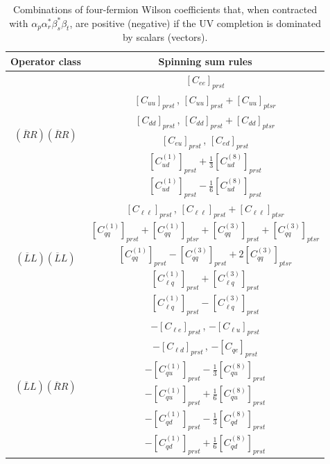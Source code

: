 \begin{table}[htbp]
\renewcommand{\arraystretch}{1.5}
    \centering
    \begin{tabular}{cc}
    \toprule
    \rowcolor{hdrcolor}
    \textbf{Operator class} & \textbf{Spinning sum rules} \\
    \midrule
    \multirow{6}{*}{\boldmath$(\overline{R}R)(\overline{R}R)$} &
    $[C_{ee}]_{prst}$ \\
    & $[C_{uu}]_{prst}$\,, \qquad $[C_{uu}]_{prst} + [C_{uu}]_{ptsr}$ \\
    & $[C_{dd}]_{prst}$\,, \qquad $[C_{dd}]_{prst} + [C_{dd}]_{ptsr}$ \\
    & $[C_{eu}]_{prst}$\,, \qquad $[C_{ed}]_{prst}$ \\
    & $[C_{ud}^{(1)}]_{prst}+\tfrac{1}{3}[C_{ud}^{(8)}]_{prst}$ \\
    & $[C_{ud}^{(1)}]_{prst}-\tfrac{1}{6}[C_{ud}^{(8)}]_{prst}$ \\
    \midrule
    \multirow{5}{*}{\boldmath$(\overline{L}L)(\overline{L}L)$} &
    $[C_{\ell\ell}]_{prst}$\,, \qquad $[C_{\ell\ell}]_{prst} + [C_{\ell\ell}]_{ptsr}$ \\
    & $[C_{qq}^{(1)}]_{prst} + [C_{qq}^{(1)}]_{ptsr} + [C_{qq}^{(3)}]_{prst} + [C_{qq}^{(3)}]_{ptsr}$ \\
    & $[C_{qq}^{(1)}]_{prst} - [C_{qq}^{(3)}]_{prst} + 2[C_{qq}^{(3)}]_{ptsr}$ \\
    & $[C_{\ell q}^{(1)}]_{prst} + [C_{\ell q}^{(3)}]_{prst}$ \\
    & $[C_{\ell q}^{(1)}]_{prst} - [C_{\ell q}^{(3)}]_{prst}$ \\
    \midrule
    \multirow{6}{*}{\boldmath$(\overline{L}L)(\overline{R}R)$} &
    $-[C_{\ell e}]_{prst}$\,, \qquad $-[C_{\ell u}]_{prst}$ \\
    & $-[C_{\ell d}]_{prst}$\,, \qquad $-[C_{qe}]_{prst}$ \\
    & $-[C_{qu}^{(1)}]_{prst} - \tfrac{1}{3}[C_{qu}^{(8)}]_{prst}$ \\
    & $-[C_{qu}^{(1)}]_{prst} + \tfrac{1}{6}[C_{qu}^{(8)}]_{prst}$ \\
    & $-[C_{qd}^{(1)}]_{prst} - \tfrac{1}{3}[C_{qd}^{(8)}]_{prst}$ \\
    & $-[C_{qd}^{(1)}]_{prst} + \tfrac{1}{6}[C_{qd}^{(8)}]_{prst}$ \\
    \bottomrule
    \end{tabular}
    \caption{Combinations of four-fermion Wilson coefficients that, when contracted with $\alpha_p \alpha_r^* \beta^*_s \beta_t$, are positive (negative) if the UV completion is dominated by scalars (vectors).}
    \label{tab:sum_rules}
\end{table}